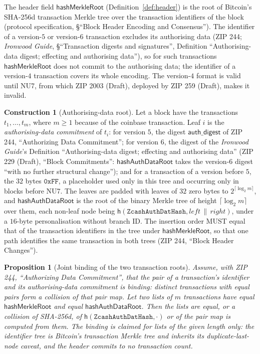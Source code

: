 \documentclass[11pt,a4paper]{article}
\newtheorem{proposition}[theorem]{Proposition}
\theoremstyle{definition}
\newtheorem{construction}[theorem]{Construction}
\begin{document}
The header field $\mathsf{hashMerkleRoot}$ (Definition~\ref{def:header}) is
the root of Bitcoin's SHA-256d transaction Merkle tree over the transaction
identifiers of the block (protocol specification, \S``Block Header Encoding
and Consensus''). The identifier of a version-$5$ or version-$6$ transaction
excludes its authorising data (ZIP 244; \emph{Ironwood Guide},
\S``Transaction digests and signatures'', Definition ``Authorising-data
digest; effecting and authorising data''), so for such transactions
$\mathsf{hashMerkleRoot}$ does not commit to the authorising data; the
identifier of a version-$4$ transaction covers its whole encoding. The
version-$4$ format is valid until NU7, from which ZIP 2003 (Draft), deployed
by ZIP 259 (Draft), makes it invalid.

\begin{construction}[Authorising-data root]\label{def:authdata-root}
Let a block have the transactions $t_1, \dots, t_m$, where $m \ge 1$ because
of the coinbase transaction. Leaf $i$ is the \emph{authorising-data
commitment} of $t_i$: for version $5$, the digest $\mathsf{auth\_digest}$ of
ZIP 244, ``Authorizing Data Commitment''; for version $6$, the digest of the
\emph{Ironwood Guide}'s Definition ``Authorising-data digest; effecting and
authorising data'' (ZIP 229 (Draft), ``Block Commitments'':
$\mathsf{hashAuthDataRoot}$ takes the version-$6$ digest ``with no further
structural change''); and for a transaction of a version before $5$, the
$32$ bytes $\mathtt{0xFF}$, a placeholder used only in this tree and
occurring only in blocks before NU7. The leaves are padded with leaves of
$32$ zero bytes to $2^{\lceil \log_2 m \rceil}$, and
$\mathsf{hashAuthDataRoot}$ is the root of the binary Merkle tree of height
$\lceil \log_2 m \rceil$ over them, each non-leaf node being
$\mathsf{h}(\texttt{ZcashAuthDatHash}, \mathit{left} \,\|\, \mathit{right})$,
under a $16$-byte personalisation without branch ID. The insertion order
MUST equal that of the transaction identifiers in the tree under
$\mathsf{hashMerkleRoot}$, so that one path identifies the same transaction
in both trees (ZIP 244, ``Block Header Changes'').
\end{construction}

\begin{proposition}[Joint binding of the two transaction roots]
\label{prop:tx-roots}
Assume, with ZIP 244, ``Authorizing Data Commitment'', that the pair of a
transaction's identifier and its authorising-data commitment is binding:
distinct transactions with equal pairs form a collision of that pair map.
Let two lists of $m$ transactions have equal $\mathsf{hashMerkleRoot}$ and
equal $\mathsf{hashAuthDataRoot}$. Then the lists are equal, or a collision
of SHA-256d, of $\mathsf{h}(\texttt{ZcashAuthDatHash}, \cdot)$ or of the
pair map is computed from them. The binding is claimed for lists of the
given length only: the identifier tree is Bitcoin's transaction Merkle tree
and inherits its duplicate-last-node caveat, and the header commits to no
transaction count.
\end{proposition}
\end{document}
